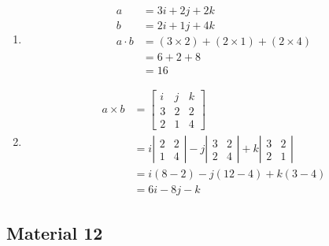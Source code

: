 \documentclass[12pt,titlepage]{article}
\begin{document}
\begin{enumerate}
{        \begin{enumerate}
            \item {
                \begin{align*}
                    a &= 3i + 2j + 2k \\
                    b &= 2i + 1j + 4k \\
                    a \cdot b &= (3 \times 2) + (2 \times 1) + (2 \times 4) \\
                    &= 6 + 2 + 8 \\
                    &= 16
                \end{align*}
            }
            \item {
                \begin{align*}
                    a \times b &= \left[ \begin{matrix}
                        i & j & k \\
                        3 & 2 & 2 \\
                        2 & 1 & 4
                    \end{matrix} \right] \\
                    &= i \left| \begin{matrix}
                        2 & 2 \\
                        1 & 4
                    \end{matrix} \right| - j \left| \begin{matrix}
                        3 & 2 \\
                        2 & 4
                    \end{matrix} \right| + k \left| \begin{matrix}
                        3 & 2 \\
                        2 & 1
                    \end{matrix} \right| \\
                    &= i(8 - 2) - j(12 - 4) + k(3 - 4) \\
                    &= 6i - 8j - k
                \end{align*}
            }
        \end{enumerate}
    }
\end{enumerate}

\pagebreak

\subsection*{Material 12}
\end{document}
